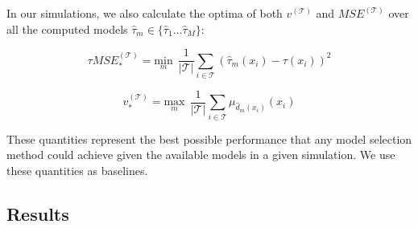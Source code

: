 In our simulations, we also calculate the optima of both $v^{(\mathcal{T})}$ and $MSE^{(\mathcal{T})}$ over all the computed models $\hat\tau_m \in \{\hat\tau_1 \dots \hat\tau_M\}$:

\[
\tau MSE^{(\mathcal{T})}_{*} = \underset{m}{\text{min}} \ \ \frac{1}{|\mathcal{T}|}\sum_{i \in \mathcal{T}} (\hat\tau_m (x_i) - \tau(x_i))^2
\]

\[
v^{(\mathcal{T})}_{*} = \underset{m}{\text{max}} \ \ \frac{1}{|\mathcal{T}|}\sum_{i \in \mathcal{T}} \mu_{\hat d_m(x_i)}(x_i)
\]

These quantities represent the best possible performance that any model selection method could achieve given the available models in a given simulation. We use these quantities as baselines.


\begin{comment}
We also calculate these using the true model $\hat\tau = \tau$, which represents the best achievable performance without specifying any models a-priori:

\[
\tau MSE^{(\mathcal{T})}_{**} = 0
\]

\[
v^{(\mathcal{T})}_{**} = \frac{1}{|\mathcal{T}|}\sum_{i \in \mathcal{T}} \mu_{ d(x_i)}(x_i)
\]

We use these minima to calculate the improvements obtained by each model selection approach relative to optimal baselines, which allows for comparison between different simulations. The relative values of $\tau MSE^{(\mathcal{T})}_{h}$ and $C^{(\mathcal{T})}_{h}$ within one test set and one set of models are

\[
	R\text{-} \tau MSE^{(\mathcal{T})}_{h} = 
	\frac{\tau MSE^{(\mathcal{T})}_{h} - \tau MSE^{(\mathcal{T})}_{**}}{\tau MSE^{(\mathcal{T})}_{*} - \tau MSE^{(\mathcal{T})}_{**}}
\]

\[
	R\text{-}  v^{(\mathcal{T})}_{h} = 
	\frac{ v^{(\mathcal{T})}_{h} -  v^{(\mathcal{T})}_{**}}{ v^{(\mathcal{T})}_{*} -  v^{(\mathcal{T})}_{**}}
\]

The closer to zero these are, the better the performance of the model selection method.
\end{comment}

\subsection{Results}


